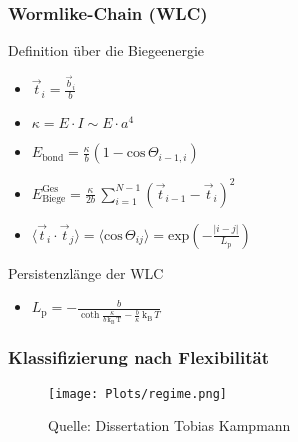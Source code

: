 \begin{frame}
   \frametitle{Wormlike-Chain (WLC)}
   \begin{block}{Definition über die Biegeenergie}
     \begin{itemize}
       \item $\vec{t}_i = \frac{\vec{b}_i}{b}$
       \item $\kappa = E \cdot I \sim E \cdot a^4$
       \item $E_{\text{bond}} = \frac{\kappa}{b} (1 - \text{cos}\,\Theta_{i-1,i})$
       \item $E_{\mathrm{Biege}}^{\mathrm{Ges}} = \frac{\kappa}{2b}\,\sum_{i=1}^{N-1} \left( \vec{t}_{i-1} - \vec{t}_{i}  \right)^2$
       \item $ \langle \vec{t}_i \cdot \vec{t}_j \rangle = \langle \text{cos} \, \Theta_{ij} \rangle  = \text{exp}{\left(- \frac{\lvert i - j \rvert}{ L_{\mathrm{p} }} \right)} $
     \end{itemize}
   \end{block}
   \begin{block}{Persistenzlänge der WLC}
     \begin{itemize}
       \item $L_{\mathrm{p}} = -\frac{b}{\coth \frac{\kappa}{b\,\mathrm{k_B\,T}} - \frac{b}{\kappa}\,\mathrm{k_B} \, T }$
     \end{itemize}
  \end{block}
\end{frame}

\begin{frame}
  \frametitle{Klassifizierung nach Flexibilität}
  \begin{figure}
    \centering
    \texttt{[image: Plots/regime.png]}
    \caption{Quelle: Dissertation Tobias Kampmann}
    \label{fig:regime}
  \end{figure}
\end{frame}

